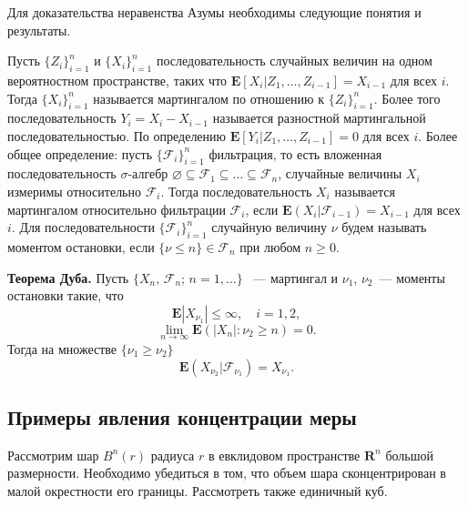 \medskip 

Для доказательства неравенства Азумы необходимы следующие понятия и результаты.

 Пусть $\{Z_i\}^{n}_{i=1}$ и  $\{X_i\}^n_{i=1}$ последовательность случайных величин на одном вероятностном пространстве, таких что $\mathbf{E}[X_i|Z_1,\dots,Z_{i-1}] = X_{i-1}$ для всех $i$. Тогда $\{X_i\}^n_{i=1}$ называется мартингалом по отношению к $\{Z_i\}^{n}_{i=1}$. Более того последовательность $Y_i = X_i-X_{i-1}$ называется разностной мартингальной последовательностью. По определению  $\mathbf{E}[Y_i|Z_1,\dots,Z_{i-1}] = 0$ для всех $i$.
Более общее определение: пусть $\{\mathcal{F}_i\}_{i=1}^n$ фильтрация, то есть вложенная последовательность $\sigma$-алгебр $\varnothing \subseteq \mathcal{F}_1\subseteq \dots \subseteq\mathcal{F}_n$, случайные величины $X_i$ измеримы относительно $\mathcal{F}_i$. Тогда  последовательность $X_i$ называется мартингалом относительно фильтрации $\mathcal{F}_i$, если $\mathbf{E}(X_i|\mathcal{F}_{i-1})=X_{i-1}$ для всех $i$.
Для последовательности $\{\mathcal{F}_i\}_{i=1}^n$  случайную величину $\nu$ будем называть моментом остановки, если $\{\nu\leq n\}\in \mathcal{F}_n$ при любом $n\geq 0$.

\textbf{Теорема Дуба.}  Пусть $\{X_n,\, \mathcal{F}_n;\,n=1,\dots\}$ ~--- мартингал и $\nu_1$, $\nu_2$~--- моменты остановки такие, что 
\begin{equation*}
\mathbf{E}|X_{\nu_1}|\leq \infty,\quad i=1,2,
\end{equation*}
\begin{equation*}
\lim_{n\to\infty}\mathbf{E}(|X_n|:\nu_2\geq n) = 0.
\end{equation*}
Тогда на множестве $\{\nu_1\geq \nu_2\}$
\begin{equation*}
\mathbf{E}(X_{\nu_2}|\mathcal{F}_{\nu_1}) = X_{\nu_1}.
\end{equation*}

\medskip

\subsection {Примеры явления концентрации меры}

\begin{problem} 
Рассмотрим шар $B^{n}(r)$ радиуса $r$ в евклидовом пространстве $\mathbf{R}^n$ большой размерности. 
 Необходимо убедиться в том, что объем шара сконцентрирован в малой окрестности его границы.
Рассмотреть также единичный куб.
\end{problem}

